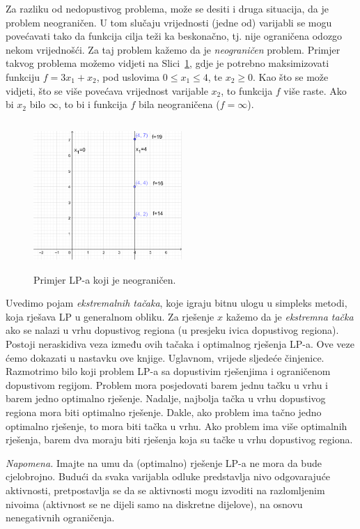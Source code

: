 \documentclass[a4paper, utf8, 11pt, colorlinks]{article}
\begin{document}
 Za razliku od nedopustivog problema, može se desiti i druga situacija, da je problem neograničen. U tom slučaju vrijednosti (jedne od) varijabli se mogu povećavati tako da funkcija cilja teži ka beskonačno, tj. nije ograničena odozgo nekom vrijednošći. Za taj problem kažemo da je \emph{neograničen} problem. Primjer takvog problema možemo vidjeti na Slici~\ref{fig:unbounded_solution}, gdje je potrebno maksimizovati funkciju $f = 3 x_1 + x_2$, pod uslovima $0\leq x_1 \leq 4$, te $x_2 \geq 0$. Kao što se može vidjeti, što se više povećava vrijednost varijable $x_2$, to funkcija $f$ više raste. Ako bi $x_2$ bilo $\infty$, to bi i funkcija $f$ bila neograničena ($f = \infty$).
 
  \begin{figure}
     \centering
     \includegraphics[width=160pt, height=160pt]{fig4.eps}
     \caption{Primjer LP-a koji je neograničen.}
     \label{fig:unbounded_solution}
 \end{figure}
 
Uvedimo pojam \emph{ekstremalnih tačaka}, koje igraju bitnu ulogu u simpleks metodi, koja rješava LP u generalnom obliku. Za rješenje $x$ kažemo da je \emph{ekstremna tačka} ako se nalazi u vrhu dopustivog regiona (u presjeku ivica dopustivog regiona).  Postoji neraskidiva veza između ovih tačaka i optimalnog rješenja LP-a. Ove veze ćemo dokazati u nastavku ove knjige. Uglavnom, vrijede sljedeće činjenice. 
Razmotrimo bilo koji problem LP-a sa dopustivim rješenjima i ograničenom dopustivom regijom. Problem mora posjedovati barem jednu tačku u vrhu i barem jedno optimalno rješenje. Nadalje, najbolja tačka u vrhu dopustivog regiona mora biti optimalno rješenje. Dakle, ako problem ima tačno jedno optimalno rješenje, to mora biti tačka u vrhu. Ako problem ima više optimalnih rješenja, barem dva moraju biti rješenja koja su tačke u vrhu dopustivog regiona.

\textit{Napomena.} Imajte na umu da (optimalno) rješenje LP-a ne mora da bude cjelobrojno. Budući da svaka varijabla odluke predstavlja nivo odgovarajuće aktivnosti, pretpostavlja se da se aktivnosti mogu izvoditi na razlomljenim nivoima (aktivnost  se ne dijeli samo na diskretne dijelove), na osnovu nenegativnih ograničenja.  
\end{document}
